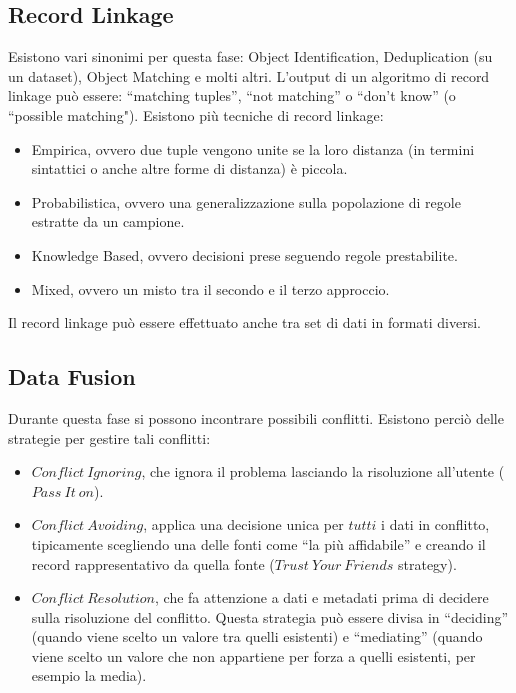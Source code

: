 \documentclass[a4page, 11pt]{article}
\begin{document}
\subsection{Record Linkage}
Esistono vari sinonimi per questa fase: Object Identification, Deduplication (su un dataset), Object Matching e molti altri. L’output di un algoritmo di record linkage può essere: “matching tuples”, “not matching” o “don’t know” (o “possible matching").\newline
Esistono più tecniche di record linkage:
\begin{itemize}[noitemsep]
\item Empirica, ovvero due tuple vengono unite se la loro distanza (in termini sintattici o anche altre forme di distanza) è piccola.
\item Probabilistica, ovvero una generalizzazione sulla popolazione di regole estratte da un campione.
\item Knowledge Based, ovvero decisioni prese seguendo regole prestabilite.
\item Mixed, ovvero un misto tra il secondo e il terzo approccio.
\end{itemize}
Il record linkage può essere effettuato anche tra set di dati in formati diversi.
\subsection{Data Fusion}
Durante questa fase si possono incontrare possibili conflitti.\newline 
Esistono perciò delle strategie per gestire tali conflitti:
\begin{itemize}[noitemsep]
\item $Conflict\ Ignoring$, che ignora il problema lasciando la risoluzione all’utente ($Pass\ It\ on$).
\item $Conflict\ Avoiding$, applica una decisione unica per $tutti$ i dati in conflitto, tipicamente scegliendo una delle fonti come “la più affidabile” e creando il record rappresentativo da quella fonte ($Trust\ Your\ Friends$ strategy).
\item $Conflict\ Resolution$, che fa attenzione a dati e metadati prima di decidere sulla risoluzione del conflitto. Questa strategia può essere divisa in “deciding” (quando viene scelto un valore tra quelli esistenti) e “mediating” (quando viene scelto un valore che non appartiene per forza a quelli esistenti, per esempio la media).
\end{itemize}
\clearpage
\printbibliography
\end{document}
